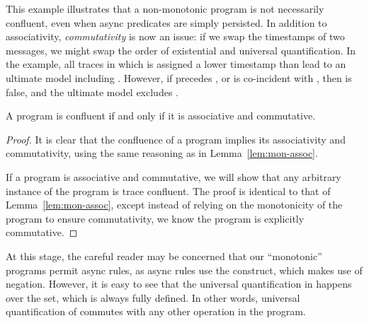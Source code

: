This example illustrates that a non-monotonic program is not necessarily
confluent, even when async predicates are simply persisted.  In addition to
associativity, {\em commutativity} is now an issue: if we swap the timestamps
of two messages, we might swap the order of existential and universal
quantification.  In the example, all traces in which  is assigned a
lower timestamp than  lead to an ultimate model including
.  However, if  precedes , or is
co-incident with , then  is false, and the
ultimate model excludes .

\begin{lemma}
%
A \lang program is confluent if and only if it is associative and commutative.
%
\end{lemma}

\begin{proof}
%
It is clear that the confluence of a \lang program implies its associativity
and commutativity, using the same reasoning as in Lemma~\ref{lem:mon-assoc}.

If a \lang program is associative and commutative, we will show that any
arbitrary instance of the \lang program is trace confluent.  The proof is
identical to that of Lemma~\ref{lem:mon-assoc}, except instead of relying on
the monotonicity of the program to ensure commutativity, we know the program is
explicitly commutative.
%
\end{proof}

At this stage, the careful reader may be concerned that our ``monotonic''
programs permit async rules, as async rules use the  construct,
which makes use of negation.  However, it is easy to see that the universal
quantification in  happens over the  set, which
is always fully defined.  In other words, universal quantification of
 commutes with any other operation in the program.


